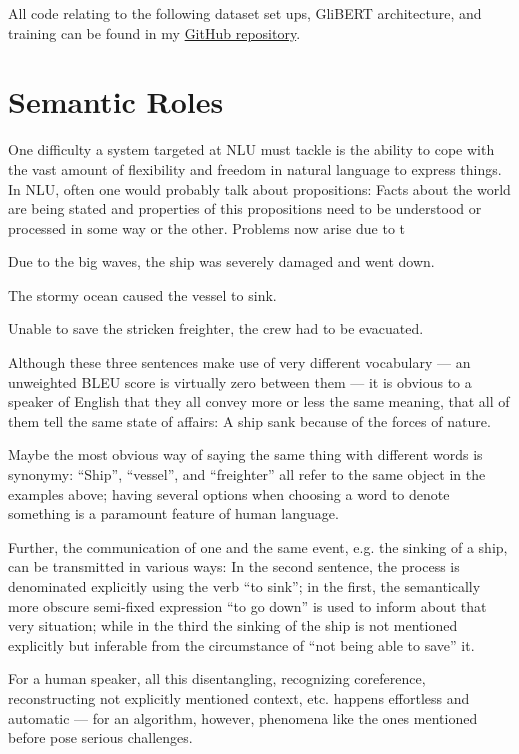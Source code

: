 All code relating to the following dataset set ups, GliBERT architecture, and training can be found in
my \href{https://github.com/JonathanSchaber/Masterarbeit}{GitHub repository}.


\section{Semantic Roles}

One difficulty a system targeted at NLU must tackle is the ability to cope with the vast amount of
flexibility and freedom in natural language to express things. In NLU, often one would probably
talk about propositions: Facts about the world are being stated and properties of this propositions
need to be understood or processed in some way or the other.
{\color{red} Problems now arise due to t}

\begin{examples}
  \label{ex:semantics}
  \item Due to the big waves, the ship was severely damaged and went down.
  \item The stormy ocean caused the vessel to sink.
  \item Unable to save the stricken freighter, the crew had to be evacuated.
\end{examples}

Although these three sentences make use of very different vocabulary --- an unweighted BLEU score
is virtually zero between them --- it is obvious to a speaker of English that they all convey more
or less the same meaning, that all of them tell the same state of affairs: A ship sank because of the
forces of nature.

Maybe the most obvious way of saying the same thing with different words is synonymy: ``Ship'',
``vessel'', and ``freighter'' all refer to the same object in the examples above; having several
options when choosing a word to denote something is a paramount feature of human language.

Further, the communication of one and the same event, e.g. the sinking
of a ship, can be transmitted in various ways: In the second sentence,
the process is denominated explicitly using the verb ``to sink''; in
the first, the semantically more obscure semi-fixed expression ``to go
down'' is used to inform about that very situation; while in the third
the sinking of the ship is not mentioned explicitly but inferable from
the circumstance of ``not being able to save'' it.

For a human speaker, all this disentangling, recognizing coreference,
reconstructing not explicitly mentioned context, etc. happens effortless
and automatic --- for an algorithm, however, phenomena like the ones
mentioned before pose serious challenges.

